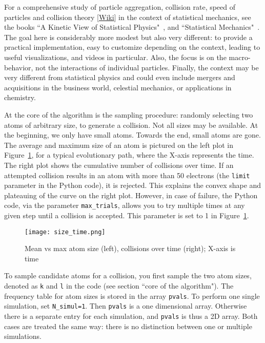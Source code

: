 \documentclass[oneside,10pt]{book}
\begin{document}
For a comprehensive study of particle aggregation, collision rate, speed of particles and \textcolor{index}{collision theory} [\href{https://en.wikipedia.org/wiki/Collision_theory}{Wiki}] in the context of statistical mechanics, see the books
``A Kinetic View of Statistical Physics"~\cite{knie}, and ``Statistical Mechanics"~\cite{sp496}.
The goal here is considerably more modest but also very different: to provide
 a practical implementation, easy to customize depending on the context, leading to useful visualizations, and videos in particular. Also, the focus is on the macro-behavior, not the interactions of individual particles. Finally, the context may be very different from statistical physics and could even include mergers and acquisitions
 in the business world, celestial mechanics, or applications in chemistry.


At the core of the algorithm is the sampling procedure: randomly selecting two atoms of arbitrary size, to generate a collision. Not all sizes may be available. At the beginning, we only have small atoms. Towards the end, small atoms are gone. The average and maximum size of an atom is pictured on the left plot in Figure~\ref{fig:pif65lkh}, for a
 typical evolutionary path, where the X-axis represents the time. The right plot shows the cumulative number of collisions over time. If an attempted collision results in an atom with more than 50 electrons (the \texttt{limit} parameter in the Python code), it is rejected. This explains the convex shape and plateauing of the curve on the right plot. However, in case of failure, the Python code, via the parameter \texttt{max\_trials}, allows you to try multiple times at any given step until a collision is accepted. This parameter is set to 1 in Figure~\ref{fig:pif65lkh}.

\begin{figure}[H]
\centering
\texttt{[image: size\_time.png]}
\caption{Mean vs max atom size (left), collisions over time (right); X-axis is time}
\label{fig:pif65lkh}
\end{figure}

To sample candidate atoms for a collision, you first sample the two atom sizes, denoted as
\texttt{k} and \texttt{l} in the code (see section ``core of the algorithm"). The frequency table for atom sizes is stored
 in the array \texttt{pvals}. To perform one single simulation, set \texttt{N\_simul=1}. Then \texttt{pvals} is a
 one dimensional array. Otherwise there is a separate entry for each simulation, and \texttt{pvals} is thus a 2D array.
 Both cases are treated the same way: there is no distinction between one or multiple simulations.
\end{document}
